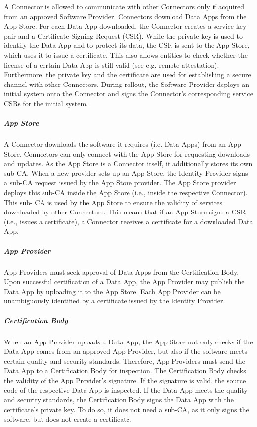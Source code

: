 A Connector is allowed to communicate with other Connectors only if acquired from an approved Software Provider. Connectors download Data Apps from the App Store. For each Data App downloaded, the Connector creates a service key pair and a Certificate Signing Request (CSR). While the private key is used to identify the Data App and to protect its data, the CSR is sent to the App Store, which uses it to issue a certificate. This also allows entities to check whether the license of a certain Data App is still valid (see e.g. remote attestation). Furthermore, the private key and the certificate are used for establishing a secure channel with other Connectors. During rollout, the Software Provider deploys an initial system onto the Connector and signs the Connector's corresponding service CSRs for the initial system.

\subparagraph*{App Store \\}

A Connector downloads the software it requires (i.e. Data Apps) from an App Store. Connectors can only connect with the App Store for requesting downloads and updates. As the App Store is a Connector itself, it additionally stores its own sub-CA. When a new provider sets up an App Store, the Identity Provider signs a sub-CA request issued by the App Store provider. The App Store provider deploys this sub-CA inside the App Store (i.e., inside the respective Connector). This sub- CA is used by the App Store to ensure the validity of services downloaded by other Connectors. This means that if an App Store signs a CSR (i.e., issues a certificate), a Connector receives a certificate for a downloaded Data App.

\subparagraph*{App Provider \\}

App Providers must seek approval of Data Apps from the Certification Body. Upon successful certification of a Data App, the App Provider may publish the Data App by uploading it to the App Store. Each App Provider can be unambiguously identified by a certificate issued by the Identity Provider.

\subparagraph*{Certification Body \\}

When an App Provider uploads a Data App, the App Store not only checks if the Data App comes from an approved App Provider, but also if the software meets certain quality and security standards. Therefore, App Providers must send the Data App to a Certification Body for inspection. The Certification Body checks the validity of the App Provider’s signature. If the signature is valid, the source code of the respective Data App is inspected. If the Data App meets the quality and security standards, the Certification Body signs the Data App with the certificate's private key. To do so, it does not need a sub-CA, as it only signs the software, but does not create a certificate.

